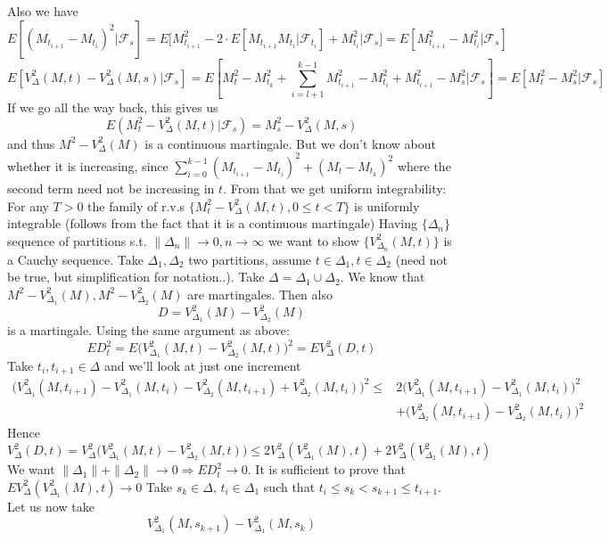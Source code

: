 \documentclass[english]{article}
\newcommand{\F}{\mathcal F}
\begin{document}
Also we have
$$E[(M_{t_{i+1}} - M_{t_i})^2 | \F_s] = E\Big[M^2_{t_{i+1}} - 2\cdot E[M_{t_{i+1}} M_{t_i}| \F_{t_i}] + M^2_{t_i} \Big| \F_s \Big] = E[M^2_{t_{i+1}} - M^2_{t_i} | \F_s]$$
$$E[V^2_\Delta(M,t) - V^2_\Delta(M,s) |\F_s] = E[M^2_t - M^2_{t_k} + \sum^{k-1}_{i=l+1} M^2_{t_{i+1}} - M^2_{t_i} + M^2_{t_{l+1}} - M^2_s | \F_s] = E[M^2_t - M^2_s | \F_s]$$
If we go all the way back, this gives us
$$E(M^2_t - V^2_\Delta(M,t)|\F_s) = M^2_s - V^2_\Delta(M,s)$$
and thus $M^2-V^2_\Delta(M)$ is a continuous martingale. But we don't know about whether it is increasing, since $\sum^{k-1}_{i=0} (M_{t_{i+1}} - M_{t_i})^2 + (M_t - M_{t_k})^2$ where the second term need not be increasing in $t$. \newline
From that we get uniform integrability: For any $T>0$ the family of r.v.s $\{M^2_t - V^2_\Delta(M,t), 0 \leq t < T \}$ is uniformly integrable (follows from the fact that it is a continuous martingale) \newline
Having $\{\Delta_n\}$ sequence of partitions s.t. $\|\Delta_n\| \to 0, n \to \infty$ we want to show $\{V^2_{\Delta_n}(M,t)\}$ is a Cauchy sequence. \newline
Take $\Delta_1, \Delta_2$ two partitions, assume $t\in \Delta_1, t\in \Delta_2$ (need not be true, but simplification for notation..). Take $\Delta = \Delta_1 \cup \Delta_2$. We know that $M^2 - V^2_{\Delta_1} (M), M^2 - V^2_{\Delta_2} (M)$ are martingales. Then also
$$D = V^2_{\Delta_1} (M) - V^2_{\Delta_2} (M)$$
is a martingale. Using the same argument as above:
$$ED_t^2 = E\big(V^2_{\Delta_1} (M,t) - V^2_{\Delta_2}  (M,t)\big)^2 = EV^2_\Delta(D,t)$$
Take $t_i, t_{i+1} \in \Delta$ and we'll look at just one increment
\begin{align*}\big(V^2_{\Delta_1} (M, t_{i+1}) - V^2_{\Delta_1}(M, t_i) - V^2_{\Delta_2}(M, t_{i+1}) + V^2_{\Delta_2}(M, t_i)\big)^2 \leq  &2 \big(V^2_{\Delta_1}(M, t_{i+1}) - V^2_{\Delta_1}(M, t_i)\big)^2 \\ &+ \big(V^2_{\Delta_2}(M, t_{i+1}) - V^2_{\Delta_2}(M, t_i)\big)^2
\end{align*}
Hence
$$V^2_\Delta(D,t) = V^2_\Delta\big( V^2_{\Delta_1} (M,t) - V^2_{\Delta_2} (M,t)\big) \leq 2 V^2_\Delta(V^2_{\Delta_1} (M), t) + 2V^2_\Delta(V^2_{\Delta_2}(M), t)$$
We want $\| \Delta_1 \| + \|\Delta_2\| \to 0 \Rightarrow ED^2_t \to 0$. It is sufficient to prove that $EV^2_\Delta(V^2_{\Delta_1}(M), t) \to 0$ \newline
Take $s_k \in \Delta$, $t_i \in \Delta_1$ such that $t_i \leq s_k < s_{k+1} \leq t_{i+1}$. Let us now take
$$V^2_{\Delta_1} (M, s_{k+1}) - V^2_{\Delta_1}(M, s_k)$$
\end{document}
